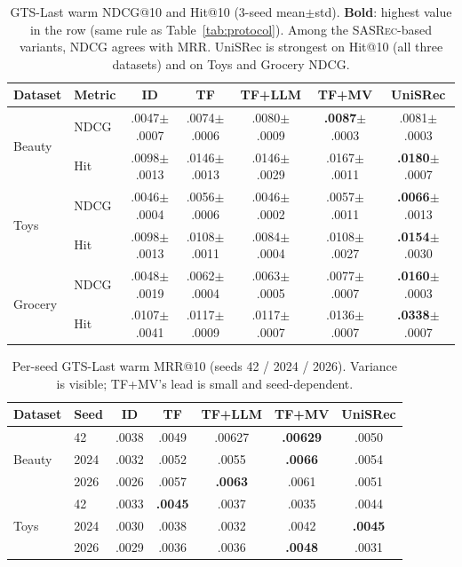 \documentclass[sigconf,natbib=true,anonymous]{acmart}
\newcommand{\tfmv}{\textsc{TF+MV}\xspace}
\newcommand{\base}{\textsc{SASRec}\xspace}
\begin{document}
\begin{table}[t]
\centering
\caption{%
GTS-Last warm NDCG@10 and Hit@10 (3-seed mean$\pm$std).
\textbf{Bold}: highest value in the row (same rule as Table~\ref{tab:protocol}).
Among the \base-based variants, NDCG agrees with MRR.
UniSRec is strongest on Hit@10 (all three datasets) and on Toys and Grocery NDCG.
}
\label{tab:ndcg_hit}
\small
\setlength{\tabcolsep}{2.5pt}
\begin{tabular}{@{}llccccc@{}}
\toprule
Dataset & Metric & ID & TF & TF+LLM & TF+MV & UniSRec \\
\midrule
\multirow{2}{*}{Beauty}
 & NDCG & .0047\tiny{$\pm$.0007} & .0074\tiny{$\pm$.0006} & .0080\tiny{$\pm$.0009} & \textbf{.0087}\tiny{$\pm$.0003} & .0081\tiny{$\pm$.0003} \\
 & Hit  & .0098\tiny{$\pm$.0013} & .0146\tiny{$\pm$.0013} & .0146\tiny{$\pm$.0029} & .0167\tiny{$\pm$.0011} & \textbf{.0180}\tiny{$\pm$.0007} \\
\midrule
\multirow{2}{*}{Toys}
 & NDCG & .0046\tiny{$\pm$.0004} & .0056\tiny{$\pm$.0006} & .0046\tiny{$\pm$.0002} & .0057\tiny{$\pm$.0011} & \textbf{.0066}\tiny{$\pm$.0013} \\
 & Hit  & .0098\tiny{$\pm$.0013} & .0108\tiny{$\pm$.0011} & .0084\tiny{$\pm$.0004} & .0108\tiny{$\pm$.0027} & \textbf{.0154}\tiny{$\pm$.0030} \\
\midrule
\multirow{2}{*}{Grocery}
 & NDCG & .0048\tiny{$\pm$.0019} & .0062\tiny{$\pm$.0004} & .0063\tiny{$\pm$.0005} & .0077\tiny{$\pm$.0007} & \textbf{.0160}\tiny{$\pm$.0003} \\
 & Hit  & .0107\tiny{$\pm$.0041} & .0117\tiny{$\pm$.0009} & .0117\tiny{$\pm$.0007} & .0136\tiny{$\pm$.0007} & \textbf{.0338}\tiny{$\pm$.0007} \\
\bottomrule
\end{tabular}
\end{table}

\begin{table}[t]
\centering
\caption{%
Per-seed GTS-Last warm MRR@10 (seeds 42 / 2024 / 2026).
Variance is visible; \tfmv's lead is small and seed-dependent.%
}
\label{tab:perseed}
\small
\setlength{\tabcolsep}{3pt}
\begin{tabular}{@{}llccccc@{}}
\toprule
Dataset & Seed & ID & TF & TF+LLM & TF+MV & UniSRec \\
\midrule
\multirow{3}{*}{Beauty}
 & 42    & .0038 & .0049 & .00627 & \textbf{.00629} & .0050 \\
 & 2024  & .0032 & .0052 & .0055 & \textbf{.0066} & .0054 \\
 & 2026  & .0026 & .0057 & \textbf{.0063} & .0061 & .0051 \\
\midrule
\multirow{3}{*}{Toys}
 & 42    & .0033 & \textbf{.0045} & .0037 & .0035 & .0044 \\
 & 2024  & .0030 & .0038 & .0032 & .0042 & \textbf{.0045} \\
 & 2026  & .0029 & .0036 & .0036 & \textbf{.0048} & .0031 \\
\bottomrule
\end{tabular}
\end{table}
\end{document}
